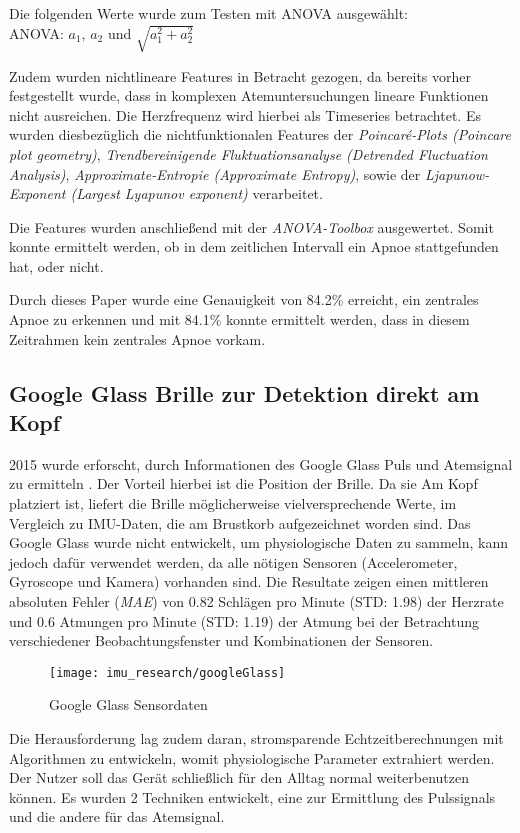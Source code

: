 Die folgenden Werte wurde zum Testen mit ANOVA ausgewählt: \\
ANOVA: $a_1$, $a_2$ und $\sqrt{a_1^{2} + a_2^{2}}$


Zudem wurden nichtlineare Features in Betracht gezogen, da bereits vorher festgestellt wurde, dass in komplexen Atemuntersuchungen lineare Funktionen nicht ausreichen. Die Herzfrequenz wird hierbei als Timeseries betrachtet.
Es wurden diesbezüglich die nichtfunktionalen Features der \textit{Poincaré-Plots (Poincare plot geometry)}, \textit{Trendbereinigende Fluktuationsanalyse (Detrended Fluctuation Analysis)}, \textit{Approximate-Entropie (Approximate Entropy)}, sowie der \textit{Ljapunow-Exponent (Largest Lyapunov exponent)} verarbeitet. 

Die Features wurden anschließend mit der \textit{ANOVA-Toolbox} ausgewertet.
Somit konnte ermittelt werden, ob in dem zeitlichen Intervall ein Apnoe stattgefunden hat, oder nicht.

Durch dieses Paper wurde eine Genauigkeit von 84.2\% erreicht, ein zentrales Apnoe zu erkennen und mit 84.1\% konnte ermittelt werden, dass in diesem Zeitrahmen kein zentrales Apnoe vorkam.


\subsection{Google Glass Brille zur Detektion direkt am Kopf}
2015 wurde erforscht, durch Informationen des Google Glass Puls und Atemsignal zu ermitteln \cite{hernandez_cardiac_nodate}. 
Der Vorteil hierbei ist die Position der Brille. 
Da sie Am Kopf platziert ist, liefert die Brille möglicherweise vielversprechende Werte, im Vergleich zu IMU-Daten, die am Brustkorb aufgezeichnet worden sind.
Das Google Glass wurde nicht entwickelt, um physiologische Daten zu sammeln, kann jedoch dafür verwendet werden, da alle nötigen Sensoren (Accelerometer, Gyroscope und Kamera) vorhanden sind.
Die Resultate zeigen einen mittleren absoluten Fehler (\textit{MAE}) von 0.82 Schlägen pro Minute (STD: 1.98) der Herzrate und 0.6 Atmungen pro Minute (STD: 1.19) der Atmung bei der Betrachtung verschiedener Beobachtungsfenster und Kombinationen der Sensoren. 
\begin{figure}[ht]
    \centering
    \texttt{[image: imu\_research/googleGlass]}
    \caption{Google Glass Sensordaten \cite{hernandez_cardiac_nodate}}
    \label{imu_research_google_glass}
\end{figure}
Die Herausforderung lag zudem daran, stromsparende Echtzeitberechnungen mit Algorithmen zu entwickeln, womit physiologische Parameter extrahiert werden. Der Nutzer soll das Gerät schließlich für den Alltag normal weiterbenutzen können. 
Es wurden 2 Techniken entwickelt, eine zur Ermittlung des Pulssignals und die andere für das Atemsignal.
